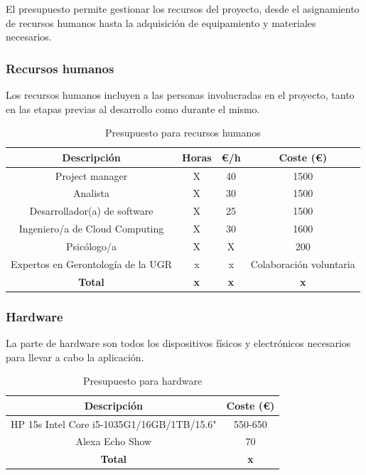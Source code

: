 El presupuesto permite gestionar los recursos del proyecto, desde el asignamiento de recursos humanos hasta la adquisición de equipamiento y materiales necesarios.

\subsubsection{Recursos humanos}
Los recursos humanos incluyen a las personas involucradas en el proyecto, tanto en las etapas previas al desarrollo como durante el mismo.

\begin{table}[H]
    \centering
    \begin{tabular}{|c|c|c|c|}
    \hline
    \rowcolor{lightgray}
    \textbf{Descripción} & \textbf{Horas} & \textbf{€/h} & \textbf{Coste (€)} \\
    \hline
    Project manager & X & 40 & 1500 \\
    \hline
    Analista & X & 30 & 1500 \\
    \hline
    Desarrollador(a) de software & X & 25 & 1500 \\
    \hline
    Ingeniero/a de Cloud Computing & X & 30 & 1600 \\
    \hline
    Psicólogo/a & X & X & 200 \\
    \hline
    Expertos en Gerontología de la UGR & x & x & Colaboración voluntaria \\
    \hline
    \textbf{Total} & \textbf{x} & \textbf{x} & \textbf{x} \\
    \hline
    \end{tabular}
    \caption{Presupuesto para recursos humanos}
    \label{tab:presupuesto-personal}
\end{table}

\subsubsection{Hardware}
La parte de hardware son todos los dispositivos físicos y electrónicos necesarios para llevar a cabo la aplicación.

\begin{table}[H]
    \centering
    \begin{tabular}{|c|c|}
    \hline
    \rowcolor{lightgray}
    \textbf{Descripción} & \textbf{Coste (€)}\\
    \hline
    HP 15s Intel Core i5-1035G1/16GB/1TB/15.6" & 550-650 \\
    \hline
    Alexa Echo Show & 70 \\
    \hline
    \textbf{Total} & \textbf{x} \\
    \hline
    \end{tabular}
    \caption{Presupuesto para hardware}
    \label{tab:presupuesto-hw}
\end{table}

